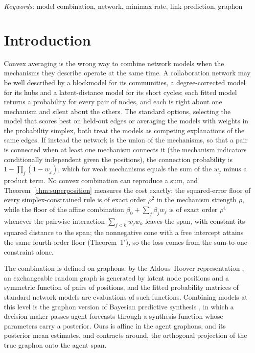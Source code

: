 \documentclass[12pt]{article}
\begin{document}
\noindent%
{\it Keywords:} model combination, network, minimax rate, link prediction, graphon
\vfill

\newpage
{}

\section{Introduction}
\label{sec:intro}

Convex averaging is the wrong way to combine network models when the mechanisms they describe operate at the same time. A collaboration network may be well described by a blockmodel for its communities, a degree-corrected model for its hubs and a latent-distance model for its short cycles; each fitted model returns a probability for every pair of nodes, and each is right about one mechanism and silent about the others. The standard options, selecting the model that scores best on held-out edges or averaging the models with weights in the probability simplex, both treat the models as competing explanations of the same edges. If instead the network is the union of the mechanisms, so that a pair is connected when at least one mechanism connects it (the mechanism indicators conditionally independent given the positions), the connection probability is $1-\prod_j(1-w_j)$, which for weak mechanisms equals the sum of the $w_j$ minus a product term. No convex combination can reproduce a sum, and Theorem~\ref{thm:superposition} measures the cost exactly: the squared-error floor of every simplex-constrained rule is of exact order $\rho^2$ in the mechanism strength $\rho$, while the floor of the affine combination $\beta_0+\sum_j\beta_jw_j$ is of exact order $\rho^4$ whenever the pairwise interaction $\sum_{j<k}w_jw_k$ leaves the span, with constant its squared distance to the span; the nonnegative cone with a free intercept attains the same fourth-order floor (Theorem~$1'$), so the loss comes from the sum-to-one constraint alone.

The combination is defined on graphons: by the Aldous--Hoover representation \citep{Aldous1985, Hoover1979}, an exchangeable random graph is generated by latent node positions and a symmetric function of pairs of positions, and the fitted probability matrices of standard network models are evaluations of such functions. Combining models at this level is the graphon version of Bayesian predictive synthesis \citep{McAlinnWest2019, McAlinnEtAl2020, TallmanWest2024}, in which a decision maker passes agent forecasts through a synthesis function whose parameters carry a posterior. Ours is affine in the agent graphons, and its posterior mean estimates, and contracts around, the orthogonal projection of the true graphon onto the agent span.
\end{document}

